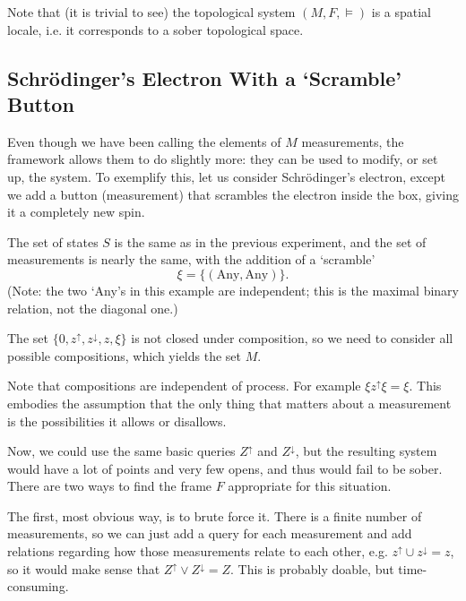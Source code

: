 \documentclass{article}
\theoremstyle{definition}
\theoremstyle{plain}
\begin{document}
Note that (it is trivial to see) the topological system $(M,F,\vDash)$ is a spatial locale, i.e. it corresponds to a sober topological space.

\subsection{Schrödinger's Electron With a `Scramble' Button}

Even though we have been calling the elements of $M$ measurements, the framework allows them to do slightly more: they can be used to modify, or set up, the system. To exemplify this, let us consider Schrödinger's electron, except we add a button (measurement) that scrambles the electron inside the box, giving it a completely new spin.

The set of states $S$ is the same as in the previous experiment, and the set of measurements is nearly the same, with the addition of a `scramble'
\begin{equation}
\xi = \{(\text{Any}, \text{Any})\}.
\end{equation}
(Note: the two `Any's in this example are independent; this is the maximal binary relation, not the diagonal one.)

The set $\{0,z^\uparrow, z^\downarrow, z, \xi\}$ is not closed under composition, so we need to consider all possible compositions, which yields the set $M$.

Note that compositions are independent of process. For example $\xi z^\uparrow \xi = \xi$. This embodies the assumption that the only thing that matters about a measurement is the possibilities it allows or disallows.

Now, we could use the same basic queries $Z^\uparrow$ and $Z^\downarrow$, but the resulting system would have a lot of points and very few opens, and thus would fail to be sober. There are two ways to find the frame $F$ appropriate for this situation.

The first, most obvious way, is to brute force it. There is a finite number of measurements, so we can just add a query for each measurement and add relations regarding how those measurements relate to each other, e.g. $z^\uparrow \cup z^\downarrow = z$, so it would make sense that $Z^\uparrow \lor Z^\downarrow = Z$. This is probably doable, but time-consuming.
\end{document}
